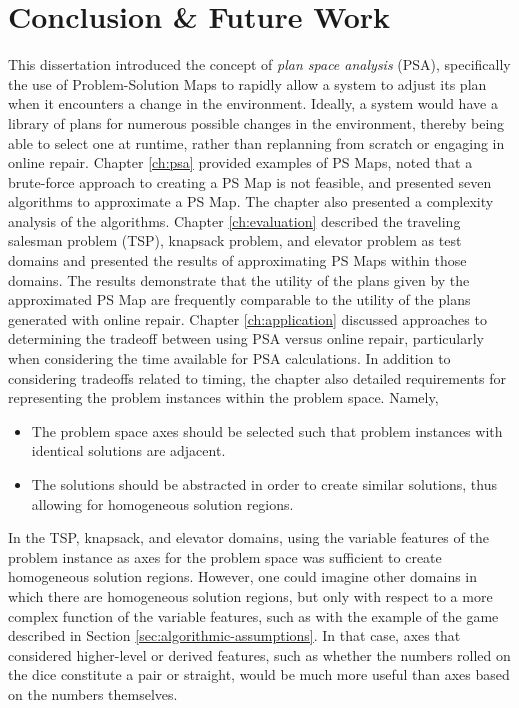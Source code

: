 \chapter{Conclusion \& Future Work}
\thispagestyle{plain}

\label{ch:future}


This dissertation introduced the concept of \textit{plan space analysis} (PSA), specifically the use of Problem-Solution Maps to rapidly allow a system to adjust its plan when it encounters a change in the environment.  Ideally, a system would have a library of plans for numerous possible changes in the environment, thereby being able to select one at runtime, rather than replanning from scratch or engaging in online repair.  Chapter \ref{ch:psa} provided  examples of PS Maps, noted that a brute-force approach to creating a PS Map is not feasible, and presented seven algorithms to approximate a PS Map.  The chapter also presented a complexity analysis of the algorithms.  Chapter \ref{ch:evaluation} described the traveling salesman problem (TSP), knapsack problem, and elevator problem as test domains and presented the results of approximating PS Maps within those domains.  The results demonstrate that the utility of the plans given by the approximated PS Map are frequently comparable to the utility of the plans generated with online repair.  Chapter \ref{ch:application} discussed approaches to determining the tradeoff between using PSA versus online repair, particularly when considering the time available for PSA calculations.  In addition to considering tradeoffs related to timing, the chapter also detailed requirements for representing the problem instances within the problem space.  Namely,
\begin{itemize}
\item The problem space axes should be selected such that problem instances with identical solutions are adjacent.
\item The solutions should be  abstracted in order to create similar solutions, thus allowing for homogeneous solution regions.
\end{itemize}

In the TSP, knapsack, and elevator domains, using the variable features of the problem instance as axes for the problem space was sufficient to create homogeneous solution regions.   However, one could imagine other domains in which there are homogeneous solution regions, but  only with respect to a more complex function of the variable features, such as with the example of the game described in Section \ref{sec:algorithmic-assumptions}.  In that case, axes that considered higher-level or derived features, such as whether the numbers rolled on the dice constitute a pair or straight, would be much more useful than axes based on the numbers themselves. 

